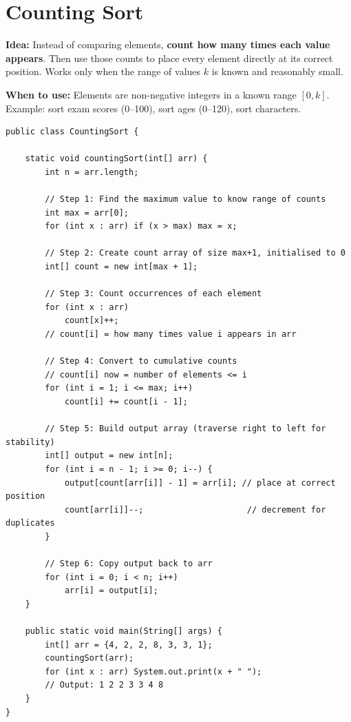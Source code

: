 \documentclass[12pt,a4paper,oneside]{book}
\begin{document}
\section{Counting Sort}

\textbf{Idea:} Instead of comparing elements, \textbf{count how many times each value appears}. Then use those counts to place every element directly at its correct position. Works only when the range of values $k$ is known and reasonably small.

\textbf{When to use:} Elements are non-negative integers in a known range $[0, k]$. Example: sort exam scores (0--100), sort ages (0--120), sort characters.

\begin{lstlisting}[caption={Counting Sort --- O(n + k) time and space, stable}]
public class CountingSort {

    static void countingSort(int[] arr) {
        int n = arr.length;

        // Step 1: Find the maximum value to know range of counts
        int max = arr[0];
        for (int x : arr) if (x > max) max = x;

        // Step 2: Create count array of size max+1, initialised to 0
        int[] count = new int[max + 1];

        // Step 3: Count occurrences of each element
        for (int x : arr)
            count[x]++;
        // count[i] = how many times value i appears in arr

        // Step 4: Convert to cumulative counts
        // count[i] now = number of elements <= i
        for (int i = 1; i <= max; i++)
            count[i] += count[i - 1];

        // Step 5: Build output array (traverse right to left for stability)
        int[] output = new int[n];
        for (int i = n - 1; i >= 0; i--) {
            output[count[arr[i]] - 1] = arr[i]; // place at correct position
            count[arr[i]]--;                     // decrement for duplicates
        }

        // Step 6: Copy output back to arr
        for (int i = 0; i < n; i++)
            arr[i] = output[i];
    }

    public static void main(String[] args) {
        int[] arr = {4, 2, 2, 8, 3, 3, 1};
        countingSort(arr);
        for (int x : arr) System.out.print(x + " ");
        // Output: 1 2 2 3 3 4 8
    }
}
\end{lstlisting}
\end{document}
